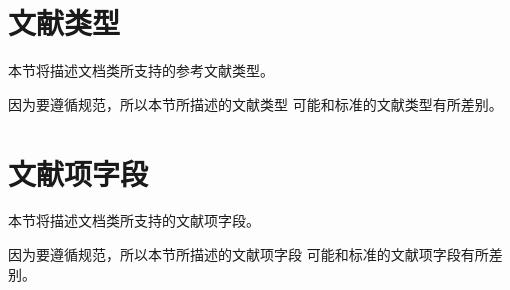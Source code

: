 \section{文献类型}\label{sec:bib-type}

本节将描述{\njuthesis}文档类所支持的参考文献类型。

\begin{note}
因为要遵循规范\cite{gbt7714-2005}，所以本节所描述的文献类型
可能和标准{\BibTeX}的文献类型有所差别。
\end{note}























\section{文献项字段}\label{sec:bib-field}

本节将描述{\njuthesis}文档类所支持的文献项字段。

\begin{note}
因为要遵循规范\cite{gbt7714-2005}，所以本节所描述的文献项字段
可能和标准{\BibTeX}的文献项字段有所差别。
\end{note}























